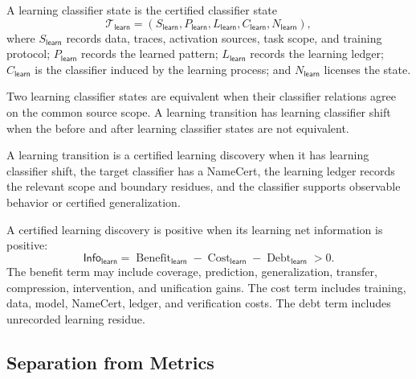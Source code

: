 \begin{definition}
\label{def:philosophy-learning-classifier-state}
A learning classifier state is the certified classifier state
$$
\mathcal T_{\mathsf{learn}}
=
(S_{\mathsf{learn}},
P_{\mathsf{learn}},
L_{\mathsf{learn}},
C_{\mathsf{learn}},
N_{\mathsf{learn}}),
$$
where $S_{\mathsf{learn}}$ records data, traces, activation sources,
task scope, and training protocol; $P_{\mathsf{learn}}$ records the
learned pattern; $L_{\mathsf{learn}}$ records the learning ledger;
$C_{\mathsf{learn}}$ is the classifier induced by the learning process;
and $N_{\mathsf{learn}}$ licenses the state.
\end{definition}

\begin{definition}
\label{def:philosophy-learning-classifier-shift}
Two learning classifier states are equivalent when their classifier
relations agree on the common source scope. A learning transition has
learning classifier shift when the before and after learning classifier
states are not equivalent.
\end{definition}

\begin{definition}
\label{def:philosophy-certified-learning-discovery}
A learning transition is a certified learning discovery when it has
learning classifier shift, the target classifier has a NameCert, the
learning ledger records the relevant scope and boundary residues, and
the classifier supports observable behavior or certified
generalization.
\end{definition}

\begin{definition}
\label{def:philosophy-positive-certified-learning}
A certified learning discovery is positive when its learning net
information is positive:
$$
\mathsf{Info}_{\mathsf{learn}}
=
\operatorname{Benefit}_{\mathsf{learn}}
-
\operatorname{Cost}_{\mathsf{learn}}
-
\operatorname{Debt}_{\mathsf{learn}}
>
0.
$$
The benefit term may include coverage, prediction, generalization,
transfer, compression, intervention, and unification gains. The cost term
includes training, data, model, NameCert, ledger, and verification costs.
The debt term includes unrecorded learning residue.
\end{definition}

\subsection{Separation from Metrics}
\label{subsec:philosophy-learning-metric-separation}

